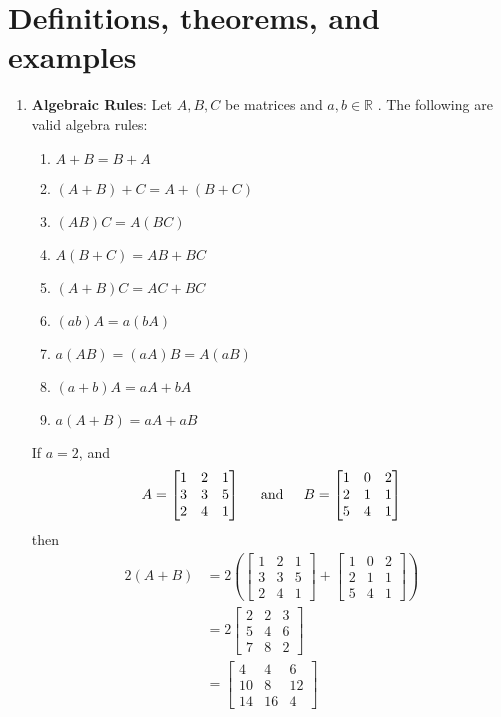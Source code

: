 \section*{Definitions, theorems, and examples}
\begin{enumerate}
\item  \textbf{Algebraic Rules}:  Let $A, B, C$ be matrices and $a, b \in \mathbb{R}$ .  The following are valid algebra rules:
\begin{enumerate}
	\item $A+B = B+A$
	\item $(A+B)+C = A+(B+C)$
	\item $(AB)C = A(BC)$
	\item $A(B+C) = AB + BC$
	
	\item $(A+B)C = AC + BC$
	\item $(ab)A = a(bA)$
	\item $ a (AB) = (aA)B = A(aB)$
	\item $(a+b)A = aA+bA$
	\item $a(A+B) = aA +aB$
\end{enumerate}




\begin{example} If $a = 2$, and 
$$ A = \begin{bmatrix}  1& 2& 1\\ 3 & 3 & 5 \\ 2  &  4  &  1 \end{bmatrix} \text{\;\;\;\; and \;\;\;\;} B = \begin{bmatrix}  1& 0& 2\\ 2 & 1 &  1 \\ 5  &  4  &  1 \end{bmatrix}$$ 
then
 \begin{align*}
  2(A+B)  &= 2 \left( \begin{bmatrix}  1& 2& 1\\ 3 & 3 & 5 \\ 2  &  4  &  1 \end{bmatrix}+  \begin{bmatrix}  1& 0& 2\\ 2 & 1 &  1 \\ 5  &  4  &  1 \end{bmatrix} \right) \\
  &= 2 \begin{bmatrix} 2 & 2  &3 \\ 5 & 4 & 6 \\ 7  &  8  &  2  \end{bmatrix}\\
  &= \begin{bmatrix} 4 & 4  &6 \\ 10 & 8 & 12 \\ 14  &  16  &  4  \end{bmatrix}
 \end{align*}
 

\end{example}
\end{enumerate}
